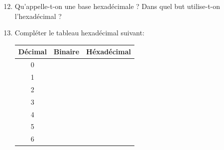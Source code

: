 \documentclass{article}
\begin{document}
\begin{enumerate}
	\setcounter{enumi}{11}
	\item Qu'appelle-t-on une base hexadécimale ? Dans quel but utilise-t-on l'hexadécimal ?\\
\vspace{1em}
\begin{Form}
	\TextField[name=r11,width=\linewidth,height=2.5em,multiline=true]{}
\end{Form}
	\item Compléter le tableau hexadécimal suivant:
\vspace{1em}
\begin{center}
	\begin{Form}
		\begin{tabular}{|c|c|c|c|c|c|}
			\hline
			Décimal & \multicolumn{4}{c|}{Binaire} & Héxadécimal \\
			\hline
			\hline
			0 & \TextField[name=r11b00,width=2em]{} & \TextField[name=r11b01,width=2em]{} & \TextField[name=r11b02,width=2em]{} & \TextField[name=r11b03,width=2em]{} & \TextField[name=r11h0,width=8em]{}\\
			\hline
			1 & \TextField[name=r11b10,width=2em]{} & \TextField[name=r11b11,width=2em]{} & \TextField[name=r11b12,width=2em]{} & \TextField[name=r11b13,width=2em]{} & \TextField[name=r11h1,width=8em]{}\\
			\hline
			2 & \TextField[name=r11b20,width=2em]{} & \TextField[name=r11b21,width=2em]{} & \TextField[name=r11b22,width=2em]{} & \TextField[name=r11b23,width=2em]{} & \TextField[name=r11h2,width=8em]{}\\
			\hline
			3 & \TextField[name=r11b30,width=2em]{} & \TextField[name=r11b31,width=2em]{} & \TextField[name=r11b32,width=2em]{} & \TextField[name=r11b33,width=2em]{} & \TextField[name=r11h3,width=8em]{}\\
			\hline
			4 & \TextField[name=r11b40,width=2em]{} & \TextField[name=r11b41,width=2em]{} & \TextField[name=r11b42,width=2em]{} & \TextField[name=r11b43,width=2em]{} & \TextField[name=r11h4,width=8em]{}\\
			\hline
			5 & \TextField[name=r11b50,width=2em]{} & \TextField[name=r11b51,width=2em]{} & \TextField[name=r11b52,width=2em]{} & \TextField[name=r11b53,width=2em]{} & \TextField[name=r11h5,width=8em]{}\\
			\hline
			6 & \TextField[name=r11b60,width=2em]{} & \TextField[name=r11b61,width=2em]{} & \TextField[name=r11b62,width=2em]{} & \TextField[name=r11b63,width=2em]{} & \TextField[name=r11h6,width=8em]{}\\

\end{tabular}
\end{Form}
\end{center}
\end{enumerate}
\end{document}
